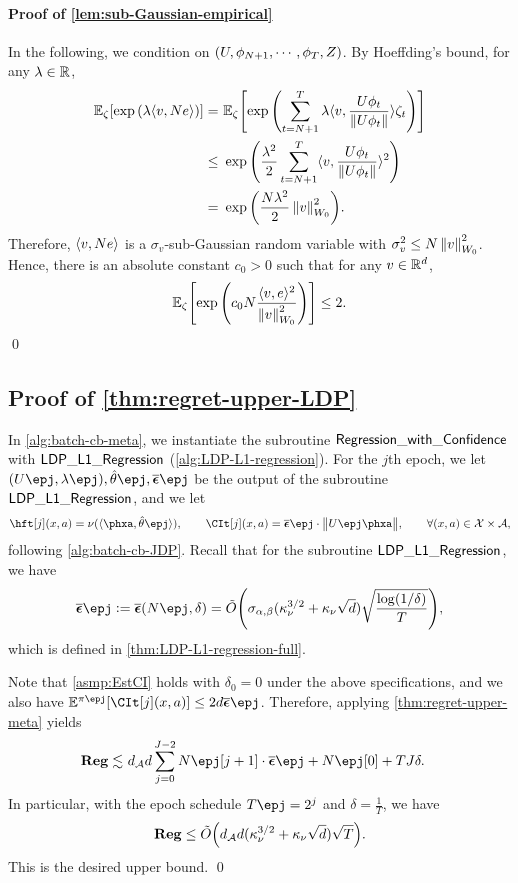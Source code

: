 \paragraph{Proof of \cref{lem:sub-Gaussian-empirical}}
In the following, we condition on $(U,\phi_{N+1},\cdots,\phi_T,Z)$.
By Hoeffding's bound, for any $\lambda\in\mathbb{R}$,
\begin{align*}
    \mathbb{E}_\zeta{\left[  \exp{\left(  \lambda \langle v,Ne\rangle\right)}  \right]}
    =&~ \mathbb{E}_\zeta{\left[  \exp{\left(  \sum_{t=N+1}^T\lambda \langle v,\frac{U\phi_t}{\|U\phi_t\|}\rangle\zeta_t\right)}  \right]} \\
    \leq&~ \exp{\left(  \frac{\lambda^2}{2}\sum_{t=N+1}^T\langle v,\frac{U\phi_t}{\|U\phi_t\|}\rangle^2  \right)} \\
    =&~ \exp{\left(  \frac{N\lambda^2}{2}\left\|v\right\|_{W_0}^2  \right)}.
\end{align*}
Therefore, $\langle v, Ne\rangle$ is a $\sigma_v$-sub-Gaussian random variable with $\sigma^2_v\leq N\left\|v\right\|_{W_0}^2$. Hence, there is an absolute constant $c_0>0$ such that for any $v\in\mathbb{R}^d$,
\begin{align*}
    \mathbb{E}_\zeta{\left[  \exp{\left(  c_0N\frac{\langle v,e\rangle^2}{\left\|v\right\|_{W_0}^2}  \right)}  \right]}\leq 2.
\end{align*}
\qed


\subsection{Proof of \cref{thm:regret-upper-LDP}}\label{appdx:regret-upper-LDP}


In \cref{alg:batch-cb-meta}, we instantiate the subroutine $\mathsf{Regression\_with\_Confidence}$ with $\mathsf{LDP\_L1\_Regression}$ (\cref{alg:LDP-L1-regression}). For the $j$th epoch, we let $(U\epj,\lambda\epj), \hth\epj, \lamall\epj$ be the output of the subroutine $\mathsf{LDP\_L1\_Regression}$, and we let
\begin{align*}
    \hft[j](x,a)=\nu(\lr \phxa, \hth\epj \rr), \qquad
    \CIt[j](x,a)=\lamall \epj \cdot \nrmn{U\epj \phxa}, \qquad \forall (x,a)\in\cX\times\cA,
\end{align*}
following \cref{alg:batch-cb-JDP}. Recall that for the subroutine $\mathsf{LDP\_L1\_Regression}$, we have
\begin{align*}
    \lamall\epj\defeq \lamall(N\epj,\delta)=\tbO{\siga (\kpg^{3/2}+\kpg\sqrt{d})\sqrt{\frac{\log(1/\delta)}{T}}},
\end{align*}
which is defined in \cref{thm:LDP-L1-regression-full}. 

Note that \cref{asmp:EstCI} holds with $\delta_0=0$ under the above specifications, and we also have $\EE^{\pi\epj}\brac{\CIt[j](x,a)}\leq 2d\lamall\epj$. Therefore, applying \cref{thm:regret-upper-meta} yields
\begin{align*}
    \Reg\leqsim&~ \dA d\sum_{j=0}^{J-2} N\epj[j+1] \cdot \lamall\epj + N\epj[0]+TJ\delta.
\end{align*}
In particular, with the epoch schedule $T\epj=2^{j}$ and $\delta=\frac1T$, we have
\begin{align*}
    \mathbf{Reg}\leq \tilde{O}{\left(  d_{\mathcal{A}} d(\kappa_\nu^{3/2}+\kappa_\nu\sqrt{d})\sqrt{T}  \right)}.
\end{align*}
This is the desired upper bound.
\qed
